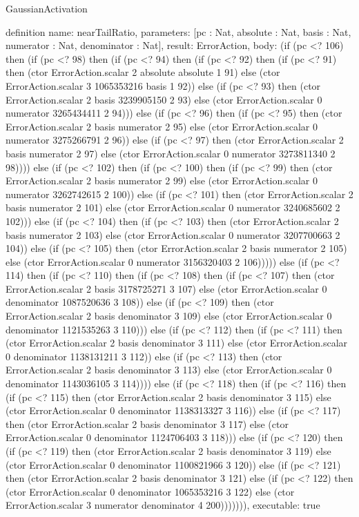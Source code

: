 \begin{lexlean}{GaussianActivation}
\begin{semanticmodule}
definition{
  name: nearTailRatio,
  parameters: [pc : Nat, absolute : Nat, basis : Nat, numerator : Nat, denominator : Nat],
  result: ErrorAction,
  body: (if (pc <? 106) then (if (pc <? 98) then (if (pc <? 94) then (if (pc <? 92) then (if (pc <? 91) then (ctor ErrorAction.scalar 2 absolute absolute 1 91) else (ctor ErrorAction.scalar 3 1065353216 basis 1 92)) else (if (pc <? 93) then (ctor ErrorAction.scalar 2 basis 3239905150 2 93) else (ctor ErrorAction.scalar 0 numerator 3265434411 2 94))) else (if (pc <? 96) then (if (pc <? 95) then (ctor ErrorAction.scalar 2 basis numerator 2 95) else (ctor ErrorAction.scalar 0 numerator 3275266791 2 96)) else (if (pc <? 97) then (ctor ErrorAction.scalar 2 basis numerator 2 97) else (ctor ErrorAction.scalar 0 numerator 3273811340 2 98)))) else (if (pc <? 102) then (if (pc <? 100) then (if (pc <? 99) then (ctor ErrorAction.scalar 2 basis numerator 2 99) else (ctor ErrorAction.scalar 0 numerator 3262742615 2 100)) else (if (pc <? 101) then (ctor ErrorAction.scalar 2 basis numerator 2 101) else (ctor ErrorAction.scalar 0 numerator 3240685602 2 102))) else (if (pc <? 104) then (if (pc <? 103) then (ctor ErrorAction.scalar 2 basis numerator 2 103) else (ctor ErrorAction.scalar 0 numerator 3207700663 2 104)) else (if (pc <? 105) then (ctor ErrorAction.scalar 2 basis numerator 2 105) else (ctor ErrorAction.scalar 0 numerator 3156320403 2 106))))) else (if (pc <? 114) then (if (pc <? 110) then (if (pc <? 108) then (if (pc <? 107) then (ctor ErrorAction.scalar 2 basis 3178725271 3 107) else (ctor ErrorAction.scalar 0 denominator 1087520636 3 108)) else (if (pc <? 109) then (ctor ErrorAction.scalar 2 basis denominator 3 109) else (ctor ErrorAction.scalar 0 denominator 1121535263 3 110))) else (if (pc <? 112) then (if (pc <? 111) then (ctor ErrorAction.scalar 2 basis denominator 3 111) else (ctor ErrorAction.scalar 0 denominator 1138131211 3 112)) else (if (pc <? 113) then (ctor ErrorAction.scalar 2 basis denominator 3 113) else (ctor ErrorAction.scalar 0 denominator 1143036105 3 114)))) else (if (pc <? 118) then (if (pc <? 116) then (if (pc <? 115) then (ctor ErrorAction.scalar 2 basis denominator 3 115) else (ctor ErrorAction.scalar 0 denominator 1138313327 3 116)) else (if (pc <? 117) then (ctor ErrorAction.scalar 2 basis denominator 3 117) else (ctor ErrorAction.scalar 0 denominator 1124706403 3 118))) else (if (pc <? 120) then (if (pc <? 119) then (ctor ErrorAction.scalar 2 basis denominator 3 119) else (ctor ErrorAction.scalar 0 denominator 1100821966 3 120)) else (if (pc <? 121) then (ctor ErrorAction.scalar 2 basis denominator 3 121) else (if (pc <? 122) then (ctor ErrorAction.scalar 0 denominator 1065353216 3 122) else (ctor ErrorAction.scalar 3 numerator denominator 4 200))))))),
  executable: true
}


\end{semanticmodule}
\end{lexlean}
